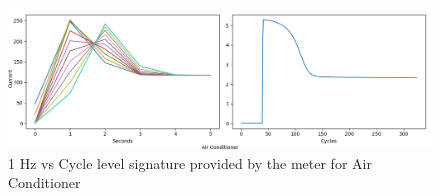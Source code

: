 \begin{figure} 
	\centering
	\includegraphics[width=1\linewidth]{images/H6AC}
	\caption[1 Hz vs Cycle level signature provided by the meter for Air Conditioner]{1 Hz vs Cycle level signature provided by the meter for Air Conditioner}
	\label{fig:H6AC}
\end{figure}
